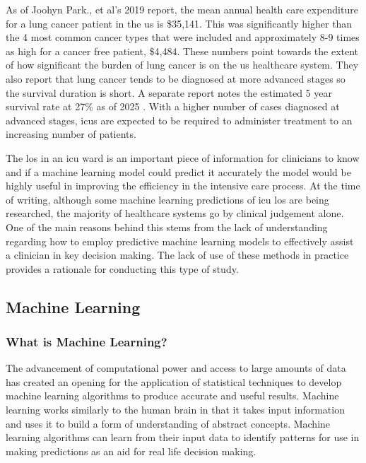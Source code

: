 \documentclass[11pt]{article}
\begin{document}
As of Joohyn Park., et al's 2019 report\cite{Park2019}, the mean annual health care expenditure for a lung cancer patient in the \gls{us} is \$35,141. This was significantly higher than the 4 most common cancer types that were included and approximately 8-9 times as high for a cancer free patient, \$4,484. These numbers point towards the extent of how significant the burden of lung cancer is on the \gls{us} healthcare system. They also report that lung cancer tends to be diagnosed at more advanced stages so the survival duration is short. A separate report notes the estimated 5 year survival rate at 27\% as of 2025 \cite{cancer}. With a higher number of cases diagnosed at advanced stages, \gls{icu}s are expected to be required to administer treatment to an increasing number of patients\cite{Laporte2018}.

The \gls{los} in an \gls{icu} ward is an important piece of information for clinicians to know and if a machine learning model could predict it accurately the model would be highly useful in improving the efficiency in the intensive care process. At the time of writing, although some machine learning predictions of \gls{icu} \gls{los} are being researched\cite{Zhang2024}\cite{Yuan2025}\cite{Zhao2026}\cite{Nguyen2026}, the majority of healthcare systems go by clinical judgement alone\cite{Mak2012}. One of the main reasons behind this stems from the lack of understanding regarding how to employ predictive machine learning models to effectively assist a clinician in key decision making.\cite{MachineLearningOpportunities} The lack of use of these methods in practice provides a rationale for conducting this type of study.

\subsection{Machine Learning}

\subsubsection{What is Machine Learning?}

The advancement of computational power and access to large amounts of data has created an opening for the application of statistical techniques to develop machine learning algorithms to produce accurate and useful results. Machine learning works similarly to the human brain in that it takes input information and uses it to build a form of understanding of abstract concepts. Machine learning algorithms can learn from their input data to identify patterns for use in making predictions as an aid for real life decision making.
\end{document}
